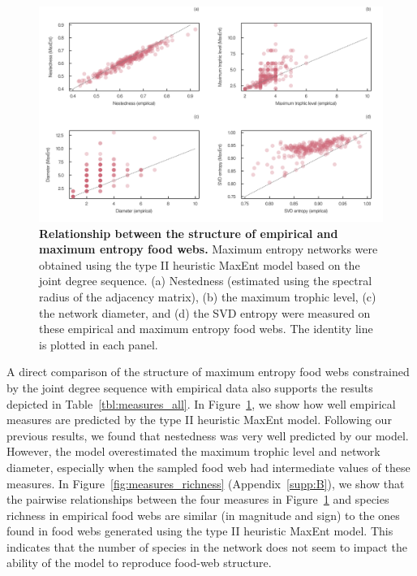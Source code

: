 \begin{figure}[!h]
  \centering
  \includegraphics[width=\textwidth]{figures/article2/measures_emp_maxent.png}
  \caption{\textbf{Relationship between the structure of empirical and maximum entropy food webs.}
  Maximum entropy networks were obtained using the type II heuristic MaxEnt
  model based on the joint degree sequence. (a) Nestedness (estimated using the
  spectral radius of the adjacency matrix), (b) the maximum trophic level, (c)
  the network diameter, and (d) the SVD entropy were measured on these empirical
  and maximum entropy food webs. The identity line is plotted in each panel.}
  \label{fig:measures}
\end{figure}

\clearpage

A direct comparison of the structure of maximum entropy food webs constrained by
the joint degree sequence with empirical data also supports the results depicted
in Table~\ref{tbl:measures_all}. In Figure~\ref{fig:measures}, we show how well
empirical measures are predicted by the type II heuristic MaxEnt model.
Following our previous results, we found that nestedness was very well predicted
by our model. However, the model overestimated the maximum trophic level and
network diameter, especially when the sampled food web had intermediate values
of these measures. In Figure~\ref{fig:measures_richness} (Appendix~\ref{supp:B}),
we show that the pairwise relationships between the four measures in
Figure~\ref{fig:measures} and species richness in empirical food webs are similar
(in magnitude and sign) to the ones found in food webs generated using the type
II heuristic MaxEnt model. This indicates that the number of species in the
network does not seem to impact the ability of the model to reproduce food-web
structure. 

